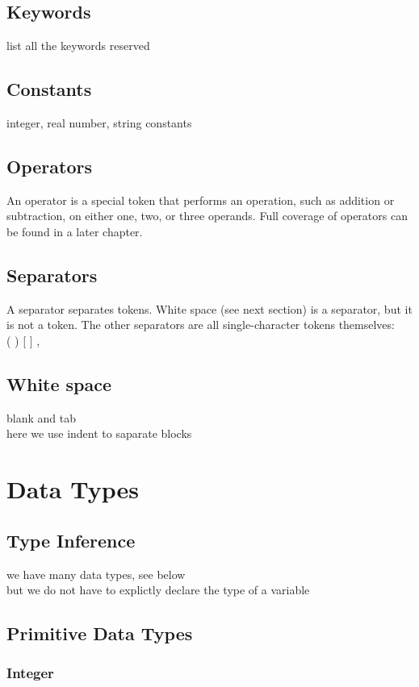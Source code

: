 \documentclass[12pt]{article}
\begin{document}
\subsection{Keywords}
list all the keywords reserved
\subsection{Constants}
integer, real number, string constants
\subsection{Operators}
An operator is a special token that performs an operation, such as addition or subtraction, on either one, two, or three operands. Full coverage of operators can be found in a later chapter. 
\subsection{Separators}
A separator separates tokens. White space (see next section) is a separator, but it is not a token. The other separators are all single-character tokens themselves: \\
( ) [ ]  , \\
\subsection{White space}
blank and tab \\
here we use indent to saparate blocks\\

\section{Data Types}

\subsection{Type Inference}
we have many data types, see below\\
but we do not have to explictly declare the type of a variable\\

\subsection{Primitive Data Types}
\subsubsection{Integer}
\end{document}
